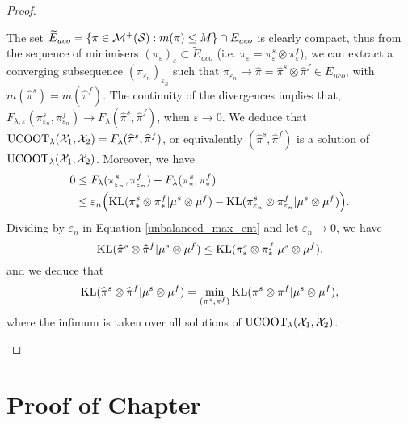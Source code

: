 \begin{proof}
\begin{enumerate}
    The set $\widetilde{E}_{uco} = \{\pi \in \mathcal M^+(\mathcal S): m(\pi) \leq M\} \cap E_{uco}$
    is clearly compact, thus from the sequence of minimisers
    $(\pi_{\varepsilon})_{\varepsilon} \subset \widetilde{E}_{uco}$
    (i.e. $\pi_{\varepsilon} = \pi_{\varepsilon}^s \otimes \pi_{\varepsilon}^f$), we can extract a
    converging subsequence $(\pi_{\varepsilon_n})_{\varepsilon_n}$ such that
    $\pi_{\varepsilon_n} \to \widehat{\pi} = \widehat{\pi}^s \otimes \widehat{\pi}^f \in \widetilde{E}_{uco}$,
    with $m(\widehat{\pi}^s) = m(\widehat{\pi}^f)$.
    The continuity of the divergences implies that,
    $F_{\lambda, \varepsilon}(\pi_{\varepsilon_n}^s, \pi_{\varepsilon_n}^f) \to
    F_{\lambda}(\widehat{\pi}^s, \widehat{\pi}^f)$, when $\varepsilon \to 0$. We deduce that
    $\text{UCOOT}_{\lambda}(\mathcal X_1, \mathcal X_2) = F_{\lambda}(\widehat{\pi}^s, \widehat{\pi}^f)$,
    or equivalently $(\widehat{\pi}^s, \widehat{\pi}^f)$
    is a solution of $\text{UCOOT}_{\lambda}(\mathcal X_1, \mathcal X_2)$. Moreover, we have
    \begin{equation} \label{unbalanced_max_ent}
      \begin{split}
        0 &\leq F_{\lambda}(\pi_{\varepsilon_n}^s, \pi_{\varepsilon_n}^f)
        - F_{\lambda}(\pi_*^s, \pi_*^f) \\
      &\leq \varepsilon_n \Big( \text{KL}(\pi_*^s \otimes \pi_*^f \vert \mu^s \otimes \mu^f) -
      \text{KL}(\pi_{\varepsilon_n}^s \otimes \pi_{\varepsilon_n}^f \vert \mu^s \otimes \mu^f) \Big).
      \end{split}
    \end{equation}
    Dividing by $\varepsilon_n$ in Equation \eqref{unbalanced_max_ent} and let
    $\varepsilon_n \to 0$, we have
    \begin{equation}
      \text{KL}(\widehat{\pi}^s \otimes \widehat{\pi}^f \vert \mu^s \otimes \mu^f) \leq
      \text{KL}(\pi_*^s \otimes \pi_*^f \vert \mu^s \otimes \mu^f).
    \end{equation}
    and we deduce that
    \begin{equation}
      \text{KL}(\widehat{\pi}^s \otimes \widehat{\pi}^f \vert \mu^s \otimes \mu^f) =
      \min_{(\pi^s, \pi^f)} \text{KL}(\pi^s \otimes \pi^f \vert \mu^s \otimes \mu^f),
    \end{equation}
    where the infimum is taken over all solutions of $\text{UCOOT}_{\lambda}(\mathcal X_1, \mathcal X_2)$.
  \end{enumerate}
\end{proof}

\section{Proof of Chapter }
